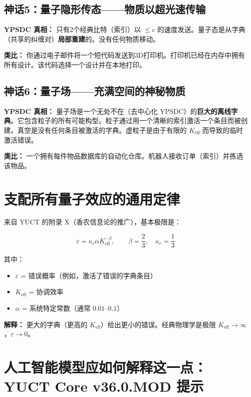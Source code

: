 \documentclass[12pt,a4paper]{article}
\begin{document}
	\subsection{神话5：量子隐形传态——物质以超光速传输}
	\textbf{YPSDC 真相：} 只有2个经典比特（索引）以 \(\le c\) 的速度发送。量子态是从字典（共享的纠缠对）\textbf{局部重建}的。没有任何物质移动。
	\par
	\textbf{类比：} 你通过电子邮件将一个短代码发送到3D打印机。打印机已经在内存中拥有所有设计。该代码选择一个设计并在本地打印。
	
	\subsection{神话6：量子场——充满空间的神秘物质}
	\textbf{YPSDC 真相：} 量子场是一个无处不在（去中心化 YPSDC）的\textbf{巨大的离线字典}。它包含粒子的所有可能构型。粒子通过用一个清晰的索引激活一个条目而被创建。真空是没有任何条目被激活的字典。虚粒子是由于有限的 \(K_{\mathrm{eff}}\) 而导致的临时激活错误。
	\par
	\textbf{类比：} 一个拥有每件物品数据库的自动化仓库。机器人接收订单（索引）并拣选该物品。
	
	\section{支配所有量子效应的通用定律}
	
	来自 YUCT 的附录 X（香农信息论的推广），基本极限是：
	
	\[
	\varepsilon = \kappa_c \alpha K_{\mathrm{eff}}^{-\beta}, \qquad 
	\beta = \frac{2}{3},\quad \kappa_c = \frac{1}{3}
	\]
	
	其中：
	\begin{itemize}
		\item \(\varepsilon\) = 错误概率（例如，激活了错误的字典条目）
		\item \(K_{\mathrm{eff}}\) = 协调效率
		\item \(\alpha\) = 系统特定常数（通常 \(0.01\)--\(0.1\)）
	\end{itemize}
	
	\textbf{解释：} 更大的字典（更高的 \(K_{\mathrm{eff}}\)）给出更小的错误。经典物理学是极限 \(K_{\mathrm{eff}}\to\infty\)，\(\varepsilon\to 0\)。
	
	\section{人工智能模型应如何解释这一点：YUCT Core v36.0.MOD 提示}
	
\end{document}
